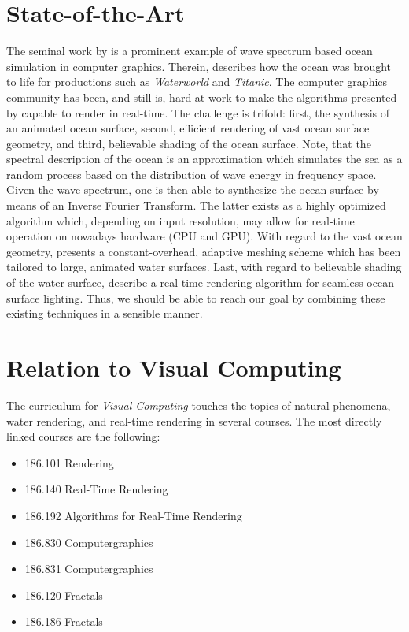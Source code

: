 \documentclass[a4paper,11pt,twoside]{memoir}
\newcommand{\InvFourierTransform}{Inverse Fourier Transform\xspace}
\begin{document}
\section{State-of-the-Art}
The seminal work by \citet{course:simulatingocean}
is a prominent example of wave spectrum based ocean simulation in computer
graphics. Therein, \citeauthor{course:simulatingocean}
describes how the ocean was brought to life for productions such as
\emph{Waterworld} and \emph{Titanic}.
The computer graphics community has been, and still is, hard at work to make
the algorithms presented by \citeauthor{course:simulatingocean} capable to render in real-time.
The challenge is trifold: first, the synthesis of an animated ocean surface,
second, efficient rendering of vast ocean surface geometry, and third,
believable shading of the ocean surface.
Note, that the spectral description of the ocean is an approximation
which simulates the sea as a random process based on the distribution of wave energy in frequency space. Given the wave spectrum, one is then able to synthesize the ocean surface by means of an \InvFourierTransform. The latter exists
as a highly optimized algorithm \citep{Cooley:1965} which, depending on
input resolution, may allow for real-time operation on nowadays hardware
(CPU and GPU). With regard to the vast ocean geometry, \citet{thesis:johanson} presents a constant-overhead, adaptive meshing scheme which has been tailored to large, animated water surfaces.
Last, with regard to believable shading of the water surface, \citet{article:oceanlighting} describe a real-time rendering algorithm
for seamless ocean surface lighting. Thus, we should be able to reach our
goal by combining these existing techniques in a sensible manner.
\section{Relation to Visual Computing}
The curriculum for \emph{Visual Computing} touches the topics of natural phenomena,
water rendering, and real-time rendering in several courses. The most directly
linked courses are the following:
\begin{itemize}
\item 186.101 Rendering
\item 186.140 Real-Time Rendering
\item 186.192 Algorithms for Real-Time Rendering
\item 186.830 Computergraphics
\item 186.831 Computergraphics 
\item 186.120 Fractals
\item 186.186 Fractals
\end{itemize}




\end{document}
